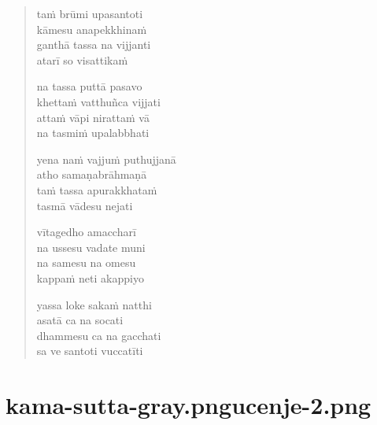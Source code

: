 \begin{verse}
taṁ brūmi upasantoti\\
kāmesu anapekkhinaṁ\\
ganthā tassa na vijjanti\\
atarī so visattikaṁ

na tassa puttā pasavo\\
khettaṁ vatthuñca vijjati\\
attaṁ vāpi nirattaṁ vā\\
na tasmiṁ upalabbhati

yena naṁ vajjuṁ puthujjanā\\
atho samaṇabrāhmaṇā\\
taṁ tassa apurakkhataṁ\\
tasmā vādesu nejati

vītagedho amaccharī\\
na ussesu vadate muni\\
na samesu na omesu\\
kappaṁ neti akappiyo

yassa loke sakaṁ natthi\\
asatā ca na socati\\
dhammesu ca na gacchati\\
sa ve santoti vuccatīti

\end{verse}


\chapter[Purābheda Sutta]{{kama-sutta-gray.png}{ucenje-2.png}}


